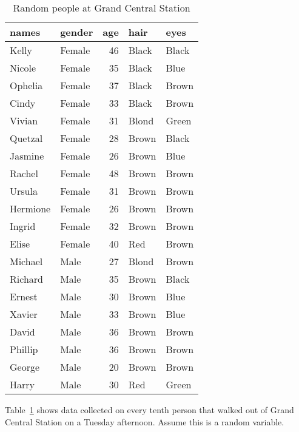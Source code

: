 \documentclass[11pt]{exam}
\begin{document}
\begin{questions}
%

\begin{table}[ht]
\begin{center}
\begin{tabular}{llrll}
  \hline
names & gender & age & hair & eyes \\ 
  \hline
Kelly & Female & 46 & Black & Black \\ 
  Nicole & Female & 35 & Black & Blue \\ 
  Ophelia & Female & 37 & Black & Brown \\ 
  Cindy & Female & 33 & Black & Brown \\ 
  Vivian & Female & 31 & Blond & Green \\ 
  Quetzal & Female & 28 & Brown & Black \\ 
  Jasmine & Female & 26 & Brown & Blue \\ 
  Rachel & Female & 48 & Brown & Brown \\ 
  Ursula & Female & 31 & Brown & Brown \\ 
  Hermione & Female & 26 & Brown & Brown \\ 
  Ingrid & Female & 32 & Brown & Brown \\ 
  Elise & Female & 40 & Red & Brown \\ 
  Michael & Male & 27 & Blond & Brown \\ 
  Richard & Male & 35 & Brown & Black \\ 
  Ernest & Male & 30 & Brown & Blue \\ 
  Xavier & Male & 33 & Brown & Blue \\ 
  David & Male & 36 & Brown & Brown \\ 
  Phillip & Male & 36 & Brown & Brown \\ 
  George & Male & 20 & Brown & Brown \\ 
  Harry & Male & 30 & Red & Green \\ 
   \hline
\end{tabular}
\caption{Random people at Grand Central Station}
\label{tab:strangers}
\end{center}
\end{table}%

    \question Table~\ref{tab:strangers} shows data collected on every tenth
    person that walked out of Grand Central Station on a Tuesday
    afternoon.  Assume this is a random variable.
\end{questions}
\end{document}
